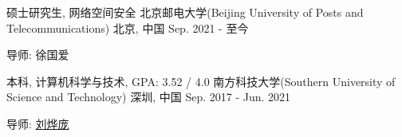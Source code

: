 

\begin{cventries}

  \cventry
    {硕士研究生, 网络空间安全}
    {北京邮电大学(Beijing University of Posts and Telecommunications)}
    {北京, 中国} %
    {Sep. 2021 - 至今} %
    {
      \begin{cvitems} %
        \item {导师: 徐国爱}
      \end{cvitems}
    }
  \cventry
    {本科, 计算机科学与技术, GPA: 3.52 / 4.0} %
    {南方科技大学(Southern University of Science and Technology)} %
    {深圳, 中国} %
    {Sep. 2017 - Jun. 2021} %
    {
      \begin{cvitems} %
        \item {导师: \href{https://yepangliu.github.io/}{刘烨庞}}
      \end{cvitems}
    }

\end{cventries}
